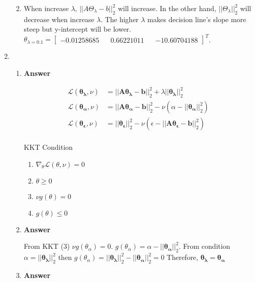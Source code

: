 \documentclass[11pt]{article}
\begin{document}
\begin{enumerate}[label=(\alph*)]
\begin{enumerate}[label=(\roman*)]
\newpage
\item  When increase $\lambda$, $||A{\Theta}_\lambda -b||_2^2$ will increase. In the other hand, $||{\Theta}_\lambda ||_2^2$ will decrease when increase $\lambda$. 
The higher $\lambda$ makes decision line's slope more steep but y-intercept will be lower.
${\theta}_{\lambda=0.1} = \begin{bmatrix}-0.01258685 && 0.66221011 && -10.60704188\end{bmatrix}^T$.
 
\end{enumerate}

\item 

\begin{enumerate}[label=(\roman*)]

\item \noindent\textbf{Answer}

\begin{align*}
\mathcal{L}(\mathbf{\theta_\lambda}, \nu)& = ||\mathbf{A\theta_\lambda-b}||_2^2 + \lambda ||\mathbf{\theta_\lambda}||_2^2  \\
\mathcal{L}(\mathbf{\theta_\alpha}, \nu)& = ||\mathbf{A\theta_\alpha-b}||_2^2 - \nu (\alpha-||\mathbf{\theta_\alpha}||_2^2)  \\
\mathcal{L}(\mathbf{\theta_\epsilon}, \nu)& = ||\mathbf{\theta_\epsilon}||_2^2 - \nu (\epsilon - ||\mathbf{A\theta_\epsilon-b}||_2^2)  \\
\end{align*}

KKT Condition

\begin{enumerate}[label=(\arabic*)]
\item $\nabla_\theta \mathcal{L}(\theta, \nu) = 0$
\item $\theta \geq 0$
\item $\nu g(\theta) = 0$
\item $g(\theta) \leq 0$
\end{enumerate}

\item \noindent\textbf{Answer}


From KKT (3) $\nu g(\theta_\alpha) = 0$.  $ g(\theta_\alpha) =\alpha-||\mathbf{\theta_\alpha||}_2^2$. 
From condition $\alpha = ||\mathbf{\theta_\lambda}||_2^2$ then  $ g(\theta_\alpha) = ||\mathbf{\theta_\lambda}||_2^2-||\mathbf{\theta_\alpha||}_2^2 = 0$
Therefore, $\mathbf{\theta_\lambda} = \mathbf{\theta_\alpha}$

\item \noindent\textbf{Answer}


\end{enumerate}
\end{enumerate}
\end{document}
